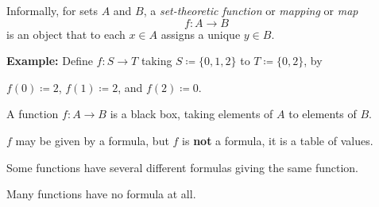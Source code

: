 \documentclass[10pt,aspectratio=169]{beamer}
\begin{document}
\begin{frame}
Informally, for sets $A$ and $B$,
a \emph{set-theoretic function} or \emph{mapping} or \emph{map}
\[
f \colon A \to B
\]
is an object that to each $x \in A$ assigns a unique $y \in B$.

\medskip
\pause
\textbf{Example:}
Define $f \colon S \to T$ taking $S \coloneqq \{ 0, 1, 2 \}$ to $T \coloneqq \{ 0, 2 \}$,
by

$f(0) \coloneqq 2$, $f(1) \coloneqq 2$, and $f(2) \coloneqq 0$.

\medskip
\pause

A function $f \colon A \to B$ is a black box,
taking elements of $A$ to elements of $B$.

\medskip
\pause

$f$ may be given by a formula, but $f$ is \textbf{not}
a formula, it is a table of values.

\pause
\medskip

Some functions have several different formulas giving the same function.

\pause
\medskip

Many functions have no formula at all.

\end{frame}
\end{document}
